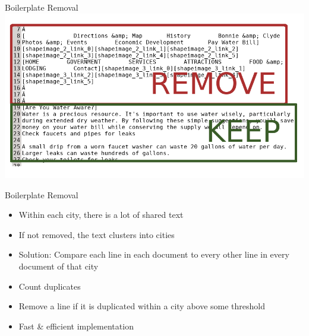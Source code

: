 \documentclass[12pt]{beamer}
\begin{document}
\begin{frame}{Boilerplate Removal}
	\includegraphics[width = \linewidth]{duplicateLineRemoval.png}
\end{frame}

\begin{frame}{Boilerplate Removal}
\begin{itemize}
	\item Within each city, there is a lot of shared text
	\item If not removed, the text clusters into cities
\end{itemize}
\begin{itemize}
	\item Solution: Compare each line in each document to every other line in every document of that city
	\item Count duplicates
	\item Remove a line if it is duplicated within a city above some threshold
	\item Fast \& efficient implementation
\end{itemize}
\end{frame}
\end{document}
